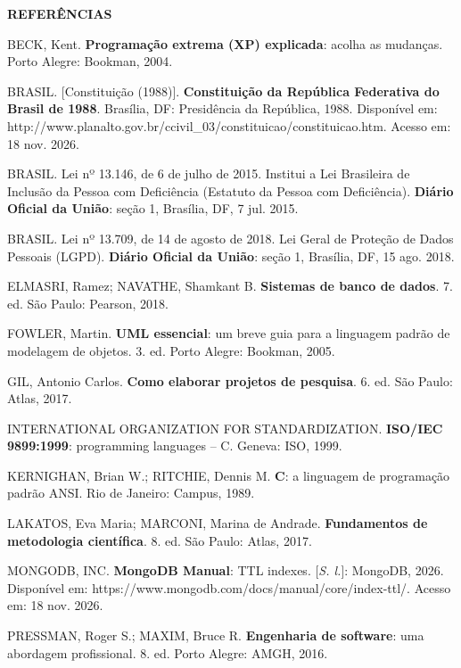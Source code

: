 \documentclass[12pt,a4paper,oneside]{report}
\newcommand{\titulocentral}[1]{%
  \begin{center}\textbf{\MakeUppercase{#1}}\end{center}\vspace{0.8\baselineskip}}
\begin{document}
\clearpage
{}
{}
\titulocentral{Referências}
{\singlespacing\raggedright
\setlength{\parindent}{0pt}
\setlength{\parskip}{\baselineskip}

BECK, Kent. \textbf{Programação extrema (XP) explicada}: acolha as mudanças. Porto Alegre: Bookman, 2004.

BRASIL. [Constituição (1988)]. \textbf{Constituição da República Federativa do Brasil de 1988}.
Brasília, DF: Presidência da República, 1988. Disponível em:
http://www.planalto.gov.br/ccivil\_03/constituicao/constituicao.htm. Acesso em: 18 nov. 2026.

BRASIL. Lei nº 13.146, de 6 de julho de 2015. Institui a Lei Brasileira de Inclusão da Pessoa com
Deficiência (Estatuto da Pessoa com Deficiência). \textbf{Diário Oficial da União}: seção 1, Brasília,
DF, 7 jul. 2015.

BRASIL. Lei nº 13.709, de 14 de agosto de 2018. Lei Geral de Proteção de Dados Pessoais (LGPD).
\textbf{Diário Oficial da União}: seção 1, Brasília, DF, 15 ago. 2018.

ELMASRI, Ramez; NAVATHE, Shamkant B. \textbf{Sistemas de banco de dados}. 7. ed. São Paulo: Pearson,
2018.

FOWLER, Martin. \textbf{UML essencial}: um breve guia para a linguagem padrão de modelagem de objetos.
3. ed. Porto Alegre: Bookman, 2005.

GIL, Antonio Carlos. \textbf{Como elaborar projetos de pesquisa}. 6. ed. São Paulo: Atlas, 2017.

INTERNATIONAL ORGANIZATION FOR STANDARDIZATION. \textbf{ISO/IEC 9899:1999}: programming languages -- C.
Geneva: ISO, 1999.

KERNIGHAN, Brian W.; RITCHIE, Dennis M. \textbf{C}: a linguagem de programação padrão ANSI. Rio de
Janeiro: Campus, 1989.

LAKATOS, Eva Maria; MARCONI, Marina de Andrade. \textbf{Fundamentos de metodologia científica}. 8. ed.
São Paulo: Atlas, 2017.

MONGODB, INC. \textbf{MongoDB Manual}: TTL indexes. [\textit{S. l.}]: MongoDB, 2026. Disponível em:
https://www.mongodb.com/docs/manual/core/index-ttl/. Acesso em: 18 nov. 2026.

PRESSMAN, Roger S.; MAXIM, Bruce R. \textbf{Engenharia de software}: uma abordagem profissional. 8. ed.
Porto Alegre: AMGH, 2016.

}
\end{document}
